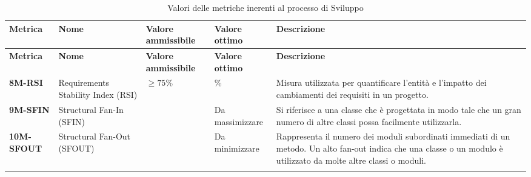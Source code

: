 \begin{longtable}{|>{\centering\arraybackslash}p{}|>{\centering\arraybackslash}p{}|>{\centering\arraybackslash}p{}|>{\centering\arraybackslash}p{}|>{\centering\arraybackslash}p{}|}
    \hline
    \textbf{Metrica} & \textbf{Nome} & \textbf{Valore ammissibile} & \textbf{Valore ottimo}& \textbf{Descrizione}\\
	\hline
    \endfirsthead
    \hline
    \textbf{Metrica} & \textbf{Nome} & \textbf{Valore ammissibile} & \textbf{Valore ottimo}& \textbf{Descrizione}\\
    \endhead
	\textbf{8M-RSI} 		& Requirements Stability Index (RSI) 	& $\geq 75\% $ 			& 100\% & Misura utilizzata per quantificare l’entità e l’impatto dei cambiamenti dei requisiti in un progetto.\\
	\hline
	\textbf{9M-SFIN} 		& Structural Fan-In (SFIN) 				&  						& Da massimizzare & Si riferisce a una classe che è progettata in modo tale che un gran numero di altre classi possa facilmente utilizzarla.\\ 
	\hline
	\textbf{10M-SFOUT} 		& Structural Fan-Out (SFOUT) 			&  						& Da minimizzare & Rappresenta il numero dei moduli subordinati immediati di un metodo. Un alto fan-out indica che una classe o un modulo è utilizzato da molte altre classi o moduli.\\ 
	\hline
	\caption{ Valori delle metriche inerenti al processo di Sviluppo}
	\label{table:2}
\end{longtable}
